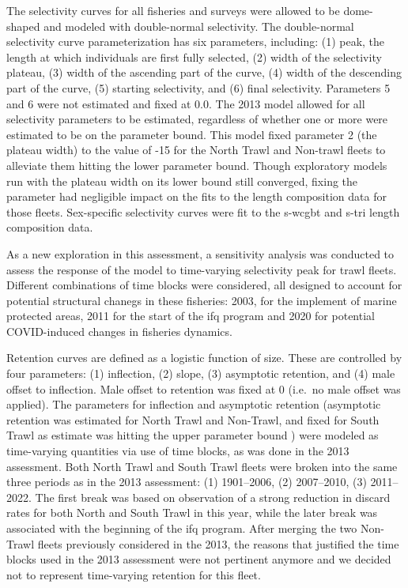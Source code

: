 \documentclass[11pt,
  english,
  letterpaper,
]{article}
\begin{document}
The selectivity curves for all fisheries and surveys were allowed to be dome-shaped and modeled with double-normal selectivity. The double-normal selectivity curve parameterization has six parameters, including: (1) peak, the length at which individuals are first fully selected, (2) width of the selectivity plateau, (3) width of the ascending part of the curve, (4) width of the descending part of the curve, (5) starting selectivity, and (6) final selectivity. Parameters 5 and 6 were not estimated and fixed at 0.0. The 2013 model allowed for all selectivity parameters to be estimated, regardless of whether one or more were estimated to be on the parameter bound. This model fixed parameter 2 (the plateau width) to the value of -15 for the North Trawl and Non-trawl fleets to alleviate them hitting the lower parameter bound. Though exploratory models run with the plateau width on its lower bound still converged, fixing the parameter had negligible impact on the fits to the length composition data for those fleets. Sex-specific selectivity curves were fit to the \gls{s-wcgbt} and \gls{s-tri} length composition data.

As a new exploration in this assessment, a sensitivity analysis was conducted to assess the response of the model to time-varying selectivity peak for trawl fleets. Different combinations of time blocks were considered, all designed to account for potential structural chanegs in these fisheries: 2003, for the implement of marine protected areas, 2011 for the start of the \gls{ifq} program and 2020 for potential COVID-induced changes in fisheries dynamics.

Retention curves are defined as a logistic function of size. These are controlled by four parameters: (1) inflection, (2) slope, (3) asymptotic retention, and (4) male offset to inflection. Male offset to retention was fixed at 0 (i.e.~no male offset was applied). The parameters for inflection and asymptotic retention (asymptotic retention was estimated for North Trawl and Non-Trawl, and fixed for South Trawl as estimate was hitting the upper parameter bound ) were modeled as time-varying quantities via use of time blocks, as was done in the 2013 assessment. Both North Trawl and South Trawl fleets were broken into the same three periods as in the 2013 assessment: (1) 1901--2006, (2) 2007--2010, (3) 2011--2022. The first break was based on observation of a strong reduction in discard rates for both North and South Trawl in this year, while the later break was associated with the beginning of the \gls{ifq} program. After merging the two Non-Trawl fleets previously considered in the 2013, the reasons that justified the time blocks used in the 2013 assessment were not pertinent anymore and we decided not to represent time-varying retention for this fleet.
\end{document}
